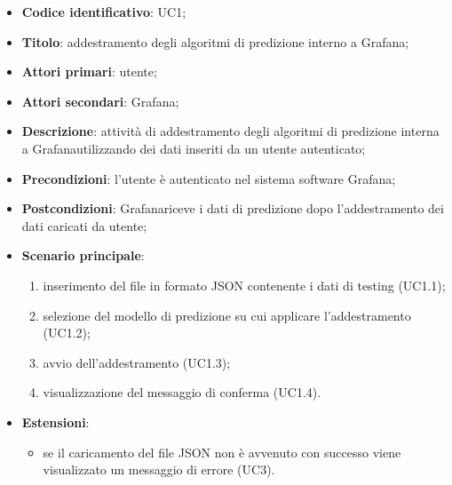 \begin{itemize}
	\item \textbf{Codice identificativo}: UC1;
	\item \textbf{Titolo}: addestramento degli algoritmi di predizione interno a Grafana\glo;
	\item \textbf{Attori primari}: utente;
	\item \textbf{Attori secondari}: Grafana\glo;
	\item \textbf{Descrizione}: attività di addestramento degli algoritmi di predizione interna a Grafana\glosp utilizzando dei dati inseriti da un utente autenticato;
	\item \textbf{Precondizioni}: l'utente è autenticato nel sistema software Grafana\glo;
	\item \textbf{Postcondizioni}: Grafana\glosp riceve i dati di predizione dopo l'addestramento dei dati caricati da utente;
	\item \textbf{Scenario principale}: 
		\begin{enumerate}
			\item inserimento del file in formato JSON contenente i dati di testing (UC1.1);
			\item selezione del modello di predizione su cui applicare l'addestramento (UC1.2);
			\item avvio dell'addestramento (UC1.3);
			\item visualizzazione del messaggio di conferma (UC1.4).
		\end{enumerate}
	\item \textbf{Estensioni}:
	\begin{itemize}
		\item se il caricamento del file JSON non è avvenuto con successo viene visualizzato un messaggio di errore (UC3).
	\end{itemize}
\end{itemize}

